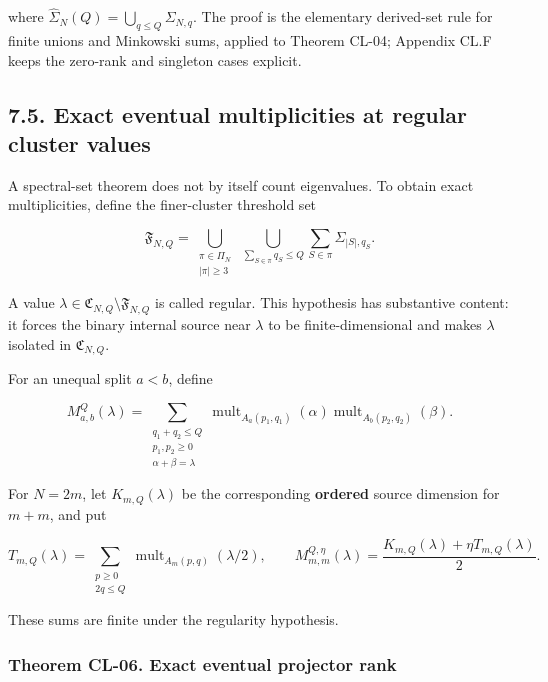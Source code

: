 \documentclass[a4paper,11pt]{article}
\numberwithin{equation}{section}
\begin{document}
where \(\widehat\Sigma_N(Q)=\bigcup_{q\leq Q}\Sigma_{N,q}\). The proof is the elementary derived-set rule for finite unions and Minkowski sums, applied to Theorem CL-04; Appendix CL.F keeps the zero-rank and singleton cases explicit.

\hypertarget{exact-eventual-multiplicities-at-regular-cluster-values}{%
\subsection{7.5. Exact eventual multiplicities at regular cluster values}\label{exact-eventual-multiplicities-at-regular-cluster-values}}

A spectral-set theorem does not by itself count eigenvalues. To obtain exact multiplicities, define the finer-cluster threshold set

\[
\mathfrak F_{N,Q}=\bigcup_{\substack{\pi\in\Pi_N\\|\pi|\geq3}}
\ \bigcup_{\sum_{S\in\pi}q_S\leq Q}
\sum_{S\in\pi}\Sigma_{|S|,q_S}.
\tag{CL.16}
\]

A value \(\lambda\in\mathfrak C_{N,Q}\setminus\mathfrak F_{N,Q}\) is called regular. This hypothesis has substantive content: it forces the binary internal source near \(\lambda\) to be finite-dimensional and makes \(\lambda\) isolated in \(\mathfrak C_{N,Q}\).

For an unequal split \(a<b\), define

\[
M_{a,b}^{Q}(\lambda)=
\sum_{\substack{q_1+q_2\leq Q\\p_1,p_2\geq0\\\alpha+\beta=\lambda}}
\operatorname{mult}_{A_a(p_1,q_1)}(\alpha)
\operatorname{mult}_{A_b(p_2,q_2)}(\beta).
\tag{CL.17}
\]

For \(N=2m\), let \(K_{m,Q}(\lambda)\) be the corresponding \textbf{ordered} source dimension for \(m+m\), and put

\[
T_{m,Q}(\lambda)=
\sum_{\substack{p\geq0\\2q\leq Q}}
\operatorname{mult}_{A_m(p,q)}(\lambda/2),
\qquad
M_{m,m}^{Q,\eta}(\lambda)
=\frac{K_{m,Q}(\lambda)+\eta T_{m,Q}(\lambda)}2.
\tag{CL.18}
\]

These sums are finite under the regularity hypothesis.

\hypertarget{theorem-cl-06.-exact-eventual-projector-rank}{%
\subsubsection{Theorem CL-06. Exact eventual projector rank}\label{theorem-cl-06.-exact-eventual-projector-rank}}
\end{document}

